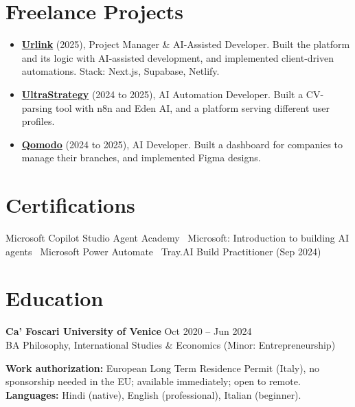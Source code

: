 \documentclass[a4paper,10pt]{article}
\begin{document}
\section{Freelance Projects}
\begin{itemize}
 \item \textbf{\href{https://smarturlink.com/}{Urlink}} (2025), Project Manager \& AI-Assisted Developer. Built the platform and its logic with AI-assisted development, and implemented client-driven automations. Stack: Next.js, Supabase, Netlify.
 \item \textbf{\href{https://ultrastrategy.com}{UltraStrategy}} (2024 to 2025), AI Automation Developer. Built a CV-parsing tool with n8n and Eden AI, and a platform serving different user profiles.
 \item \textbf{\href{https://www.qomodo.me/}{Qomodo}} (2024 to 2025), AI Developer. Built a dashboard for companies to manage their branches, and implemented Figma designs.
\end{itemize}

\section{Certifications}
Microsoft Copilot Studio Agent Academy \textbullet\ Microsoft: Introduction to building AI agents \textbullet\ Microsoft Power Automate \textbullet\ Tray.AI Build Practitioner (Sep 2024)

\section{Education}
\textbf{Ca' Foscari University of Venice} \hfill Oct 2020 -- Jun 2024\\
BA Philosophy, International Studies \& Economics (Minor: Entrepreneurship)

\vspace{4pt}
{\small \textbf{Work authorization:} European Long Term Residence Permit (Italy), no sponsorship needed in the EU; available immediately; open to remote. \quad \textbf{Languages:} Hindi (native), English (professional), Italian (beginner).}
\end{document}
